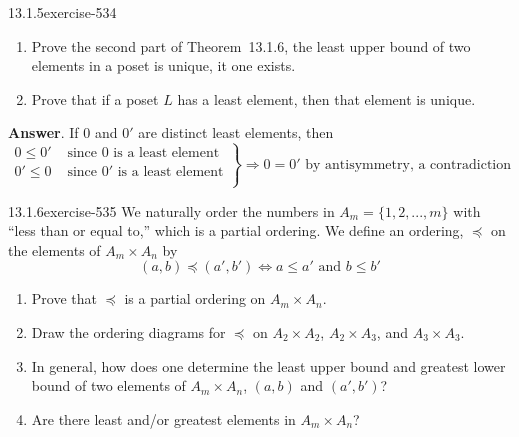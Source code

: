 \documentclass[twoside,10pt,]{book}
\numberwithin{equation}{section}
\begin{document}
\begin{divisionsolution}{13.1.5}{}{exercise-534}%
\hypertarget{p-4816}{}%
\leavevmode%
\begin{enumerate}[label=(\alph*)]
\item\hypertarget{li-2201}{}\hypertarget{p-4817}{}%
Prove the second part of Theorem~13.1.6, the least upper bound of two elements in a poset is unique, it one exists.%
\item\hypertarget{li-2202}{}\hypertarget{p-4818}{}%
Prove that if a poset \(L\) has a least element, then that element is unique.%
\end{enumerate}
%
\par\smallskip%
\noindent\textbf{Answer}.\quad%
\hypertarget{p-4819}{}%
If \(0\) and \(0'\) are distinct least elements, then%
\begin{equation*}
\left.
\begin{array}{cc}
0\leq 0' & \textrm{ since } 0 \textrm{ is a least element} \\
0'\leq 0 & \textrm{ since } 0' \textrm{ is a least element} \\
\end{array}
\right\}\Rightarrow  0=0' \textrm{ by antisymmetry, a contradiction}
\end{equation*}
%
\end{divisionsolution}%
\begin{divisionsolution}{13.1.6}{}{exercise-535}%
\hypertarget{p-4820}{}%
We naturally order the numbers in \(A_m = \{1, 2, . . . , m\}\) with ``less than or equal to,'' which is a partial ordering. We define an ordering, \(\preceq\)  on the elements of \(A_m \times  A_n\) by%
\begin{equation*}
(a, b) \preceq  (a', b') \Leftrightarrow a \leq  a' \textrm{ and } b \leq  b'
\end{equation*}
\leavevmode%
\begin{enumerate}[label=(\alph*)]
\item\hypertarget{li-2203}{}\hypertarget{p-4821}{}%
Prove that \(\preceq\) is a partial ordering on \(A_m \times  A_n\).%
\item\hypertarget{li-2204}{}\hypertarget{p-4822}{}%
Draw the ordering diagrams for \(\preceq\) on \(A_2 \times  A_2\), \(A_2\times  A_3\), and \(A_3 \times  A_3\).%
\item\hypertarget{li-2205}{}\hypertarget{p-4823}{}%
In general, how does one determine the least upper bound  and greatest lower bound of two elements of \(A_m \times  A_n\), \((a, b)\) and \((a',b')\)?%
\item\hypertarget{li-2206}{}\hypertarget{p-4824}{}%
Are there least and\slash{}or greatest elements in \(A_m \times  A_n\)?%
\end{enumerate}
%
\end{divisionsolution}%
\end{document}
